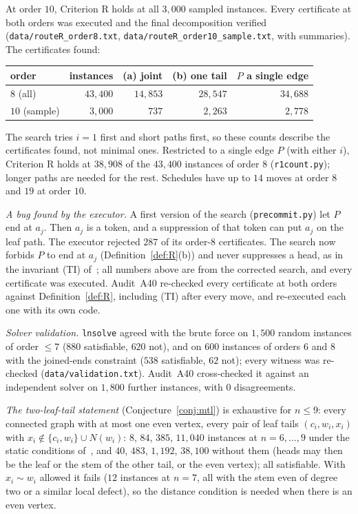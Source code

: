 \documentclass[11pt]{amsart}
\theoremstyle{definition}
\begin{document}
At order $10$, Criterion R holds at all $3{,}000$ sampled instances. Every certificate at both
orders was executed and the final decomposition verified (\texttt{data/routeR\_order8.txt},
\texttt{data/routeR\_order10\_sample.txt}, with summaries). The certificates found:
\begin{center}\footnotesize
\begin{tabular}{@{}lrrrr@{}}
\toprule
order & instances & (a) joint & (b) one tail & $P$ a single edge\\
\midrule
$8$ (all) & $43{,}400$ & $14{,}853$ & $28{,}547$ & $34{,}688$\\
$10$ (sample) & $3{,}000$ & $737$ & $2{,}263$ & $2{,}778$\\
\bottomrule
\end{tabular}
\end{center}
The search tries $i=1$ first and short paths first, so these counts describe the certificates found,
not minimal ones. Restricted to a single edge $P$ (with either $i$), Criterion R holds at $38{,}908$
of the $43{,}400$ instances of order $8$ (\texttt{r1count.py}); longer paths are needed for the rest. Schedules have up to $14$ moves at order $8$ and $19$ at order $10$.

\emph{A bug found by the executor.} A first version of the search (\texttt{precommit.py}) let $P$ end
at $a_j$. Then $a_j$ is a token, and a suppression of that token can put $a_j$ on the leaf path. The
executor rejected $287$ of its order-$8$ certificates. The search now forbids $P$ to end at $a_j$
(Definition~\ref{def:R}(b)) and never suppresses a head, as in the invariant (TI) of~\cite{MT}; all
numbers above are from the corrected search, and every certificate was executed. Audit~A40
re-checked every certificate at both orders against Definition~\ref{def:R}, including (TI) after
every move, and re-executed each one with its own code.

\emph{Solver validation.} \texttt{lnsolve} agreed with the brute force on $1{,}500$ random instances of
order $\le7$ ($880$ satisfiable, $620$ not), and on $600$ instances of orders $6$ and $8$ with the
joined-ends constraint ($538$ satisfiable, $62$ not); every witness was re-checked
(\texttt{data/validation.txt}). Audit~A40 cross-checked it against an independent solver on $1{,}800$
further instances, with $0$ disagreements.

\emph{The two-leaf-tail statement} (Conjecture~\ref{conj:mtl}) is exhaustive for $n\le9$: every
connected graph with at most one even vertex, every pair of leaf tails $(c_i,w_i,x_i)$ with
$x_i\notin\{c_i,w_i\}\cup N(w_i)$: $8$, $84$, $385$, $11{,}040$ instances at $n=6,\dots,9$ under the
static conditions of~\cite{MT}, and $40$, $483$, $1{,}192$, $38{,}100$ without them (heads may then
be the leaf or the stem of the other tail, or the even vertex); all satisfiable. With $x_i\sim w_i$ allowed it fails ($12$ instances at $n=7$, all with the stem even
of degree two or a similar local defect), so the distance condition is needed when there is an
even vertex.
\end{document}

